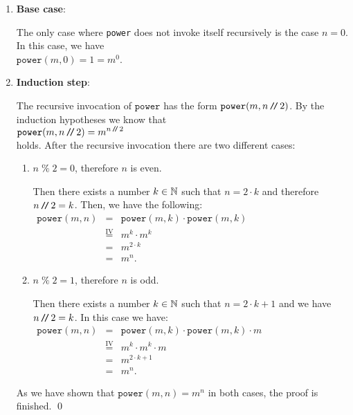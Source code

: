 \begin{enumerate}
\item \textbf{Base case}:

      The only case where \texttt{power} does not invoke itself recursively is the case $n = 0$.  
      In this case, we have
      \\[0.2cm]
      \hspace*{1.3cm} 
      $\mathtt{power}(m,0) = 1 =  m^0$.
\item \textbf{Induction step}:

      The recursive invocation of $\mathtt{power}$ has the form
      $\mathtt{power}(m,n \mbox{\,\texttt{/}$\!$\texttt{/}\,} 2)$.  By the induction hypotheses we know that 
      \\[0.2cm]
      \hspace*{1.3cm}
      $\displaystyle \mathtt{power}(m,n \mbox{\,\texttt{/}$\!$\texttt{/}\,} 2) = m^{n \mbox{\scriptsize\,\texttt{/}$\!$\texttt{/}\,} 2}$ 
      \\[0.2cm]
      holds.  After the recursive invocation there are two different cases:
      \begin{enumerate}
      \item $n \;\texttt{\%}\; 2 = 0$, therefore $n$ is even.

            Then there exists a number $k \in {\mathbb N}$ such that $n = 2 \cdot k$ and therefore
            $n \mbox{\,\texttt{/}$\!$\texttt{/}\,} 2 = k$.
            Then, we have the following:
            \\[0.2cm]
            \hspace*{1.3cm}
           $ 
            \begin{array}{lcl}
            \mathtt{power}(m,n) & = & \mathtt{power}(m,k) \cdot \mathtt{power}(m,k) \\[0.2cm]
                                & \stackrel{\mathrm{IV}}{=} & m^k \cdot m^k  \\[0.2cm]
                                & = & m^{2\cdot k} \\[0.2cm]
                                & = & m^{n}.
            \end{array}
            $            
      \item $n \;\texttt{\%}\; 2 = 1$, therefore $n$ is odd.

            Then there exists a number $k \in {\mathbb N}$ such that $n = 2 \cdot k + 1$ and we have
            $n \mbox{\,\texttt{/}$\!$\texttt{/}\,} 2 = k$.  In this case we have:
            \\[0.2cm]
            \hspace*{1.3cm}
            $ 
            \begin{array}{lcl}
            \mathtt{power}(m,n) & = & \mathtt{power}(m,k) \cdot \mathtt{power}(m,k) \cdot m  \\[0.2cm]
                                & \stackrel{\mathrm{IV}}{=} & m^k \cdot m^k \cdot m  \\[0.2cm]
                                & = & m^{2\cdot k+1} \\[0.2cm]
                                & = & m^{n}.
            \end{array}
            $
      \end{enumerate}
      As we have shown that $\mathtt{power}(m,n) = m^n$ in both cases, the proof is finished.
      \qed
\end{enumerate}
